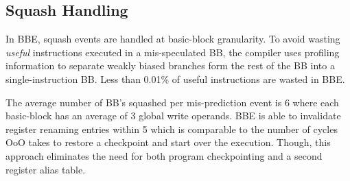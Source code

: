 \subsection{Squash Handling}
\label{sec:speculation}

In BBE, squash events are handled at basic-block granularity. To avoid wasting
{\it{useful}} instructions executed in a mis-speculated BB, the compiler uses
profiling information to separate weakly biased branches form the rest of the BB
into a single-instruction BB. Less than 0.01\% of useful instructions are wasted
in BBE.

The average number of BB's squashed per mis-prediction event is 6 where each
basic-block has an average of 3 global write operands. BBE is able to invalidate
register renaming entries within 5 which is comparable to the number of cycles
OoO takes to restore a checkpoint and start over the execution. Though, this
approach eliminates the need for both program checkpointing and a second
register alias table.



